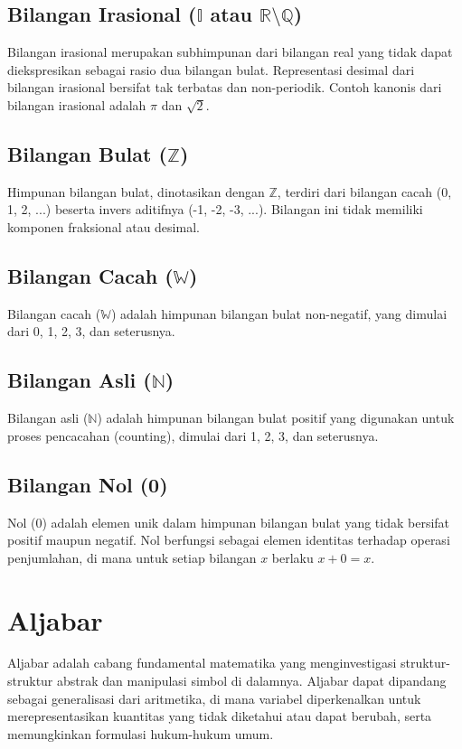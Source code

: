 \documentclass[12pt, a4paper]{article}
\begin{document}
\subsection{Bilangan Irasional ($\mathbb{I}$ atau $\mathbb{R} \setminus \mathbb{Q}$)}
Bilangan irasional merupakan subhimpunan dari bilangan real yang tidak dapat diekspresikan sebagai rasio dua bilangan bulat. Representasi desimal dari bilangan irasional bersifat tak terbatas dan non-periodik. Contoh kanonis dari bilangan irasional adalah $\pi$ dan $\sqrt{2}$.

\subsection{Bilangan Bulat ($\mathbb{Z}$)}
Himpunan bilangan bulat, dinotasikan dengan $\mathbb{Z}$, terdiri dari bilangan cacah (0, 1, 2, ...) beserta invers aditifnya (-1, -2, -3, ...). Bilangan ini tidak memiliki komponen fraksional atau desimal.

\subsection{Bilangan Cacah ($\mathbb{W}$)}
Bilangan cacah ($\mathbb{W}$) adalah himpunan bilangan bulat non-negatif, yang dimulai dari 0, 1, 2, 3, dan seterusnya.

\subsection{Bilangan Asli ($\mathbb{N}$)}
Bilangan asli ($\mathbb{N}$) adalah himpunan bilangan bulat positif yang digunakan untuk proses pencacahan (counting), dimulai dari 1, 2, 3, dan seterusnya.

\subsection{Bilangan Nol (0)}
Nol (0) adalah elemen unik dalam himpunan bilangan bulat yang tidak bersifat positif maupun negatif. Nol berfungsi sebagai elemen identitas terhadap operasi penjumlahan, di mana untuk setiap bilangan $x$ berlaku $x + 0 = x$.

\section{Aljabar}
Aljabar adalah cabang fundamental matematika yang menginvestigasi struktur-struktur abstrak dan manipulasi simbol di dalamnya. Aljabar dapat dipandang sebagai generalisasi dari aritmetika, di mana variabel diperkenalkan untuk merepresentasikan kuantitas yang tidak diketahui atau dapat berubah, serta memungkinkan formulasi hukum-hukum umum.
\end{document}

